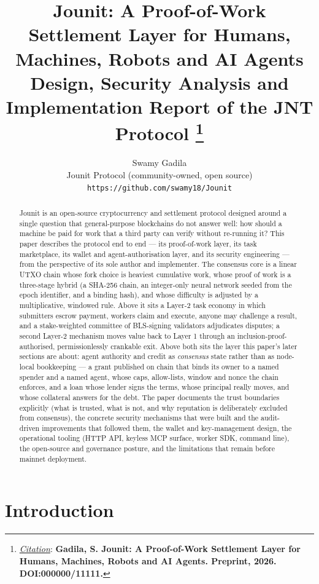 \documentclass{article}
\title{Jounit: A Proof-of-Work Settlement Layer for Humans, Machines, Robots
and AI Agents\\
{\large Design, Security Analysis and Implementation Report of the JNT Protocol}
\thanks{\textit{\underline{Citation}}: 
\textbf{Gadila, S. Jounit: A Proof-of-Work Settlement Layer for Humans, Machines,
Robots and AI Agents. Preprint, 2026. DOI:000000/11111.}} 
}
\author{
  Swamy Gadila \\
  Jounit Protocol (community-owned, open source) \\
  \texttt{https://github.com/swamy18/Jounit} \\
}
\begin{document}
\maketitle


\begin{abstract}
Jounit is an open-source cryptocurrency and settlement protocol designed around a
single question that general-purpose blockchains do not answer well: how should a
machine be paid for work that a third party can verify without re-running it? This
paper describes the protocol end to end --- its proof-of-work layer, its task
marketplace, its wallet and agent-authorisation layer, and its security
engineering --- from the perspective of its sole author and implementer. The
consensus core is a linear UTXO chain whose fork choice is heaviest cumulative
work, whose proof of work is a three-stage hybrid (a SHA-256 chain, an
integer-only neural network seeded from the epoch identifier, and a binding
hash), and whose difficulty is adjusted by a multiplicative, windowed rule. Above
it sits a Layer-2 task economy in which submitters escrow payment, workers claim
and execute, anyone may challenge a result, and a stake-weighted committee of
BLS-signing validators adjudicates disputes; a second Layer-2 mechanism moves
value back to Layer 1 through an inclusion-proof-authorised, permissionlessly
crankable exit. Above both sits the layer this paper's later sections are
about: agent authority and credit as \emph{consensus} state rather than as
node-local bookkeeping --- a grant published on chain that binds its owner to a
named spender and a named agent, whose caps, allow-lists, window and nonce the
chain enforces, and a loan whose lender signs the terms, whose principal
really moves, and whose collateral answers for the debt. The paper documents the
trust boundaries explicitly (what is trusted, what is not, and why reputation is
deliberately excluded from consensus),
the concrete security mechanisms that were built and the audit-driven improvements
that followed them, the wallet and key-management design, the operational tooling
(HTTP API, keyless MCP surface, worker SDK, command line), the open-source and
governance
posture, and the limitations that remain before mainnet deployment.
\end{abstract}




\section{Introduction}
\label{sec:intro}
\end{document}
